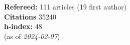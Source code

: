 \textbf{Refereed:} 111 articles (19 first author)\\\textbf{Citations} 35240\\\textbf{h-index:} 48\\(as of \textit{2024-02-07})